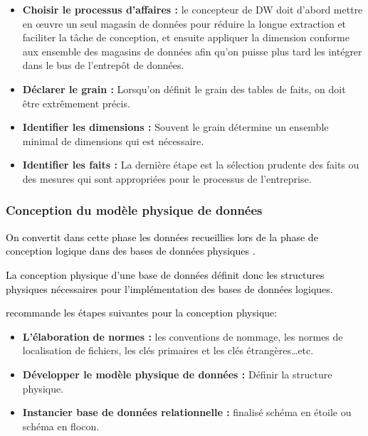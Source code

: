 \documentclass[a4paper,12pt]{report}
\begin{document}
\begin{itemize}

\item \textbf{Choisir le processus d'affaires :} le concepteur de DW doit d'abord mettre en œuvre un seul magasin de données pour réduire la longue extraction et faciliter la tâche de conception, et ensuite appliquer la dimension conforme aux ensemble des magasins de données afin qu’on puisse plus tard les intégrer dans le bus de l'entrepôt de données.

\item \textbf{Déclarer le grain :} Lorsqu’on définit le grain des tables de faits, on doit être extrêmement précis.

\item \textbf{Identifier les dimensions :} Souvent le grain détermine un ensemble minimal de dimensions qui est nécessaire. 

\item \textbf{Identifier les faits :} La dernière étape est la sélection prudente des faits ou des mesures qui sont appropriées pour le processus de l'entreprise.

\end{itemize}


\subsubsection{Conception du modèle physique de données}

\textcolor{black}{On convertit dans cette phase les données recueillies lors de la phase de conception logique dans des bases de données physiques \citep{kimball2008data} .}

\textcolor{black}{La conception physique d’une base de données définit donc les structures physiques nécessaires pour l’implémentation des bases de données logiques. 
}

\textcolor{black}{ \citep{kimball2008data} recommande les étapes suivantes pour la conception physique:}

\begin{itemize}

\item \textbf{L'élaboration de normes :} les conventions de nommage, les normes de localisation de fichiers, les clés primaires et les clés étrangères…etc.

\item 	\textbf{Développer le modèle physique de données :} Définir la structure physique.

\item 	\textbf{Instancier base de données relationnelle :}  finalisé schéma en étoile ou schéma en flocon.


\end{itemize}
\end{document}
